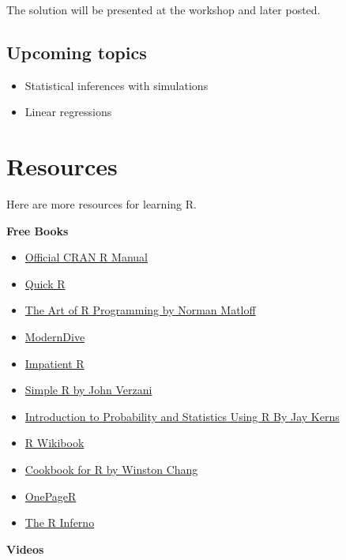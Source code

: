 \documentclass[]{book}
\theoremstyle{definition}
\theoremstyle{definition}
\theoremstyle{remark}
\begin{document}
The solution will be presented at the workshop and later posted.

\section{Upcoming topics}\label{next}

\begin{itemize}
\item
  Statistical inferences with simulations
\item
  Linear regressions
\end{itemize}

\chapter{Resources}\label{resources}

Here are more resources for learning R.

\textbf{Free Books}

\begin{itemize}
\item
  \href{http://cran.r-project.org/doc/manuals/R-intro.pdf}{Official CRAN
  R Manual}
\item
  \href{http://www.statmethods.net/}{Quick R}
\item
  \href{http://heather.cs.ucdavis.edu/~matloff/132/NSPpart.pdf}{The Art
  of R Programming by Norman Matloff}
\item
  \href{https://ismayc.github.io/moderndiver-book/}{ModernDive}
\item
  \href{http://www.burns-stat.com/documents/tutorials/impatient-r/\#keyobjects}{Impatient
  R}
\item
  \href{http://cran.r-project.org/doc/contrib/Verzani-SimpleR.pdf}{Simple
  R by John Verzani}
\item
  \href{http://ipsur.org/install.html}{Introduction to Probability and
  Statistics Using R By Jay Kerns}
\item
  \href{https://en.wikibooks.org/wiki/R_Programming}{R Wikibook}
\item
  \href{http://www.cookbook-r.com/}{Cookbook for R by Winston Chang}
\item
  \href{https://togaware.com/onepager/}{OnePageR}
\item
  \href{http://www.burns-stat.com/documents/books/the-r-inferno/}{The R
  Inferno}
\end{itemize}

\textbf{Videos}
\end{document}
